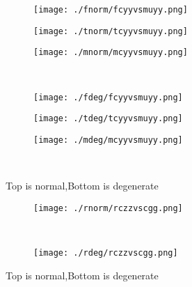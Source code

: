 \documentclass[aps,floats,floatfix,nofootinbib]{revtex4-1}
\begin{document}
\begin{center}
\begin{figure}
\begin{subfigure}{0.3\textwidth}
\texttt{[image: ./fnorm/fcyyvsmuyy.png]}
\label{}
\end{subfigure}
\begin{subfigure}{0.3\textwidth}
\texttt{[image: ./tnorm/tcyyvsmuyy.png]}
\label{}
\end{subfigure}
\begin{subfigure}{0.3\textwidth}
\texttt{[image: ./mnorm/mcyyvsmuyy.png]}
\label{}
\end{subfigure}\\
\begin{subfigure}{0.3\textwidth}
\texttt{[image: ./fdeg/fcyyvsmuyy.png]}
\label{}
\end{subfigure}
\begin{subfigure}{0.3\textwidth}
\texttt{[image: ./tdeg/tcyyvsmuyy.png]}
\label{}
\end{subfigure}
\begin{subfigure}{0.3\textwidth}
\texttt{[image: ./mdeg/mcyyvsmuyy.png]}
\label{}
\end{subfigure}\\
\caption{Top is normal,Bottom is degenerate}
\end{figure}
\end{center}

\begin{center}
\begin{figure}
\begin{subfigure}{1.0\textwidth}
\texttt{[image: ./rnorm/rczzvscgg.png]}
\label{}
\end{subfigure}\\
\begin{subfigure}{1.0\textwidth}
\texttt{[image: ./rdeg/rczzvscgg.png]}
\label{}
\end{subfigure}
\caption{Top is normal,Bottom is degenerate}
\end{figure}
\end{center}
\end{document}
